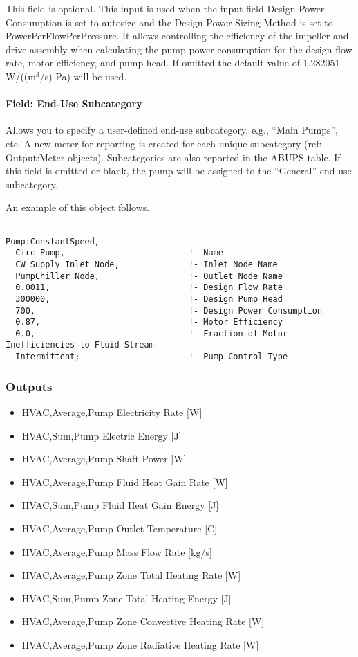 This field is optional. This input is used when the input field Design Power Consumption is set to autosize and the Design Power Sizing Method is set to PowerPerFlowPerPressure. It allows controlling the efficiency of the impeller and drive assembly when calculating the pump power consumption for the design flow rate, motor efficiency, and pump head. If omitted the default value of 1.282051 W/((m\(^{3}\)/s)-Pa) will be used.

\paragraph{Field: End-Use Subcategory}\label{field-end-use-subcategory-2-000}

Allows you to specify a user-defined end-use subcategory, e.g., ``Main Pumps'', etc. A new meter for reporting is created for each unique subcategory (ref: Output:Meter objects). Subcategories are also reported in the ABUPS table. If this field is omitted or blank, the pump will be assigned to the ``General'' end-use subcategory.

An example of this object follows.

\begin{lstlisting}

Pump:ConstantSpeed,
  Circ Pump,                         !- Name
  CW Supply Inlet Node,              !- Inlet Node Name
  PumpChiller Node,                  !- Outlet Node Name
  0.0011,                            !- Design Flow Rate
  300000,                            !- Design Pump Head
  700,                               !- Design Power Consumption
  0.87,                              !- Motor Efficiency
  0.0,                               !- Fraction of Motor Inefficiencies to Fluid Stream
  Intermittent;                      !- Pump Control Type
\end{lstlisting}

\subsubsection{Outputs}\label{outputs-1-020}

\begin{itemize}
\item
  HVAC,Average,Pump Electricity Rate {[}W{]}
\item
  HVAC,Sum,Pump Electric Energy {[}J{]}
\item
  HVAC,Average,Pump Shaft Power {[}W{]}
\item
  HVAC,Average,Pump Fluid Heat Gain Rate {[}W{]}
\item
  HVAC,Sum,Pump Fluid Heat Gain Energy {[}J{]}
\item
  HVAC,Average,Pump Outlet Temperature {[}C{]}
\item
  HVAC,Average,Pump Mass Flow Rate {[}kg/s{]}
\item
  HVAC,Average,Pump Zone Total Heating Rate {[}W{]}
\item
  HVAC,Sum,Pump Zone Total Heating Energy {[}J{]}
\item
  HVAC,Average,Pump Zone Convective Heating Rate {[}W{]}
\item
  HVAC,Average,Pump Zone Radiative Heating Rate {[}W{]}
\end{itemize}

